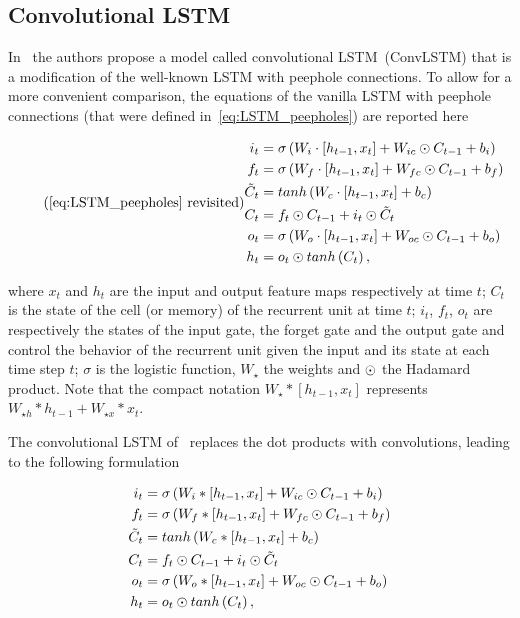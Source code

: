 \subsection{Convolutional LSTM}

In~\cite{ShiCWYWW15} the authors propose a model called convolutional
LSTM~(ConvLSTM) that is a modification of the well-known LSTM with peephole
connections. To allow for a more convenient comparison, the equations of the
vanilla LSTM with peephole connections (that were defined
in~\autoref{eq:LSTM_peepholes}) are reported here

\begin{equation*}\tag{\ref{eq:LSTM_peepholes} revisited}
\begin{split}
    i_t &= \sigma\left(W_i \cdot \left[h_{t-1}, x_t\right] +
        W_{ic} \hadamard C_{t-1} + b_i \right)\\
    f_t &= \sigma\left(W_f \cdot \left[h_{t-1}, x_t\right] +
        W_{fc} \hadamard C_{t-1} + b_f \right)\\
    \tilde C_t &= tanh \left(W_c \cdot \left[h_{t-1}, x_t\right] + b_c \right)\\
    C_t &= f_t \hadamard C_{t-1} + i_t \hadamard \tilde C_t\\
    o_t &= \sigma\left(W_o \cdot \left[h_{t-1}, x_t\right] +
        W_{oc} \hadamard C_{t-1} + b_o \right)\\
    h_t &= o_t \hadamard tanh \left(C_t\right),
\end{split}
\end{equation*}

\noindent where $x_t$ and $h_t$ are the input and output feature maps
respectively at time $t$; $C_t$ is the state of the cell (or memory) of the
recurrent unit at time $t$; $i_t$, $f_t$, $o_t$ are respectively the states of
the input gate, the forget gate and the output gate and control the behavior of
the recurrent unit given the input and its state at each time step $t$;
$\sigma$ is the logistic function, $W_{\star}$ the weights
and $\odot$ the Hadamard product. Note that the compact notation
$W_\star * [h_{t-1}, x_t]$ represents $W_{\star h} * h_{t-1} + W_{\star x} *
x_t$.

The convolutional LSTM of~\cite{ShiCWYWW15} replaces the dot products with
convolutions, leading to the following formulation

\begin{equation}
\begin{split}
    i_t &= \sigma\left(W_i * \left[h_{t-1}, x_t\right] +
        W_{ic} \odot C_{t-1} + b_i \right)\\
    f_t &= \sigma\left(W_f * \left[h_{t-1}, x_t\right] +
        W_{fc} \odot C_{t-1} + b_f \right)\\
    \tilde C_t &= tanh \left(W_c * \left[h_{t-1}, x_t\right] + b_c \right)\\
    C_t &= f_t \odot C_{t-1} + i_t \odot \tilde C_t\\
    o_t &= \sigma\left(W_o * \left[h_{t-1}, x_t\right] +
        W_{oc} \odot C_{t-1} + b_o \right)\\
    h_t &= o_t \odot tanh \left(C_t\right),
\end{split}
\end{equation}


